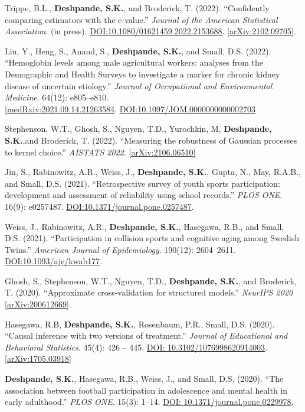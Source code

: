 \documentclass[margin]{res}
\def\skd{\textbf{Deshpande, S.K.}}
\begin{document}
\begin{resume}
Trippe, B.L., \skd, and Broderick, T. (2022). ``Confidently comparing estimators with the c-value.'' \textit{Journal of the American Statistical Association}. (in press). \href{https://doi.org/10.1080/01621459.2022.2153688}{DOI:10.1080/01621459.2022.2153688}. \href{https://arxiv.org/abs/2102.09705}{[arXiv:2102.09705]}. 

Lin, Y., Heng, S., Anand, S., \skd, and Small, D.S. (2022). ``Hemoglobin levels among male agricultural workers: analyses from the Demographic and Health Surveys to investigate a marker for chronic kidney disease of uncertain etiology.'' \textit{Journal of Occupational and Environmental Medicine}. 64(12): e805--e810. \\ \href{https://www.medrxiv.org/content/10.1101/2021.09.14.21263584v2}{[medRxiv:2021.09.14.21263584}. \href{https://doi.org/10.1097/JOM.0000000000002703}{DOI:10.1097/JOM.0000000000002703}

Stephenson, W.T., Ghosh, S., Nguyen, T.D., Yurochkin, M, \skd,and Broderick, T. (2022). ``Measuring the robustness of Gaussian processes to kernel choice.'' \textit{AISTATS 2022}. \href{https://arxiv.org/abs/2106.06510}{[arXiv:2106.06510]}

Jin, S., Rabinowitz, A.R., Weiss, J., \skd, Gupta, N., May, R.A.B., and Small, D.S. (2021). ``Retrospective survey of youth sports participation: development and assessment of reliability using school records.'' \textit{PLOS ONE}. 16(9): e0257487. \href{https://doi.org/10.1371/journal.pone.0257487}{DOI:10.1371/journal.pone.0257487}.

Weiss, J., Rabinowitz, A.R., \skd, Hasegawa, R.B., and Small, D.S. (2021). ``Participation in collision sports and cognitive aging among Swedish Twins.'' \textit{American Journal of Epidemiology}. 190(12): 2604--2611. \href{https://doi.org/10.1093/aje/kwab177}{DOI:10.1093/aje/kwab177}.

Ghosh, S., Stephenson, W.T., Nguyen, T.D., \skd, and Broderick, T. (2020). ``Approximate cross-validation for structured models.'' \textit{NeurIPS 2020} \href{https://arxiv.org/abs/2006.12669}{[arXiv:200612669]}. 

Hasegawa, R.B, \skd, Rosenbaum, P.R., Small, D.S. (2020). ``Causal inference with two versions of treatment.'' \textit{Journal of Educational and Behavioral Statistics}. 45(4): 426 -- 445. \href{https://doi.org/10.3102/1076998620914003}{DOI: 10.3102/1076998620914003}. \href{https://arxiv.org/abs/1705.03918}{[arXiv:1705.03918]}

\skd, Hasegawa, R.B., Weiss, J., and Small, D.S. (2020). ``The association between football participation in adolescence and mental health in early adulthood.'' \textit{PLOS ONE}. 15(3): 1--14. \href{https://doi.org/10.1371/journal.pone.0229978}{DOI: 10.1371/journal.pone.0229978}.


\end{resume}
\end{document}
